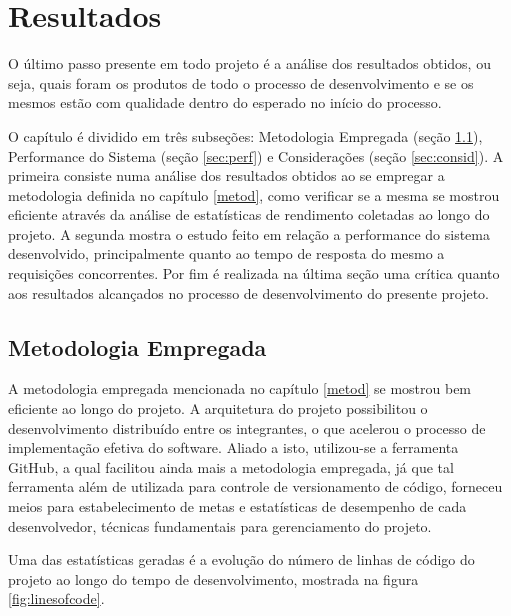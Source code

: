 \chapter{Resultados}
\label{chap:result}
O último passo presente em todo projeto é a análise dos resultados obtidos, ou seja, quais foram os produtos de todo o processo de desenvolvimento e se os mesmos estão com qualidade dentro do esperado no início do processo. 

O capítulo é dividido em três subseções: Metodologia Empregada (seção \ref{sec:metod}), Performance do Sistema (seção \ref{sec:perf}) e Considerações (seção \ref{sec:consid}). A primeira consiste numa análise dos resultados obtidos ao se empregar a metodologia definida no capítulo \ref{metod}, como verificar se a mesma se mostrou eficiente através da análise de estatísticas de rendimento coletadas ao longo do projeto. A segunda mostra o estudo feito em relação a performance do sistema desenvolvido, principalmente quanto ao tempo de resposta do mesmo a requisições concorrentes. Por fim é realizada na última seção uma crítica quanto aos resultados alcançados no processo de desenvolvimento do presente projeto.

\section{Metodologia Empregada}
\label{sec:metod}
A metodologia empregada mencionada no capítulo \ref{metod} se mostrou bem eficiente ao longo do projeto.
A arquitetura do projeto possibilitou o desenvolvimento distribuído entre os integrantes, o que acelerou o processo de implementação efetiva do software.
Aliado a isto, utilizou-se a ferramenta GitHub, a qual facilitou ainda mais a metodologia empregada, já que tal ferramenta além de utilizada para controle de versionamento de código, forneceu meios para estabelecimento de metas e estatísticas de desempenho de cada desenvolvedor, técnicas fundamentais para gerenciamento do projeto.

Uma das estatísticas geradas é a evolução do número de linhas de código do projeto ao longo do tempo de desenvolvimento, mostrada na figura \ref{fig:linesofcode}.

